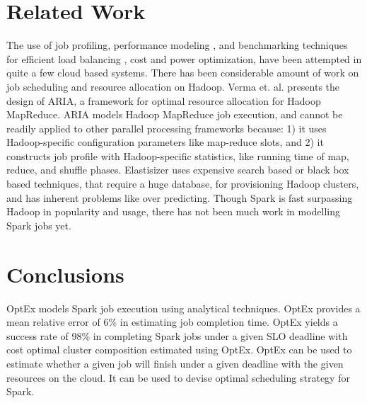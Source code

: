 \documentclass[conference]{IEEEtran}
\begin{document}
\section{Related Work}\label{sec:related}
The use of job profiling, performance modeling \cite{brebner2011}, and benchmarking techniques \cite{Dejun:2011:RPW:2002168.2002173} for efficient load
balancing \cite{daniel2011prediction, Imai:2013:ARP:2588611.2588688}, cost \cite{singer2010towards} and power optimization, have been attempted in quite a few cloud based systems.
There has been considerable amount of work
\cite{Herodotou:2011:NOS:2038916.2038934,Verma:2011:AAR:1998582.1998637, alrokayan2014sla}
 on job scheduling and resource allocation on Hadoop. Verma et. al. \cite{Verma:2011:AAR:1998582.1998637} presents the design of ARIA, a
framework for optimal resource allocation for Hadoop MapReduce.
ARIA \cite{Verma:2011:AAR:1998582.1998637} models Hadoop MapReduce job execution, and cannot be readily applied to other parallel processing frameworks because: 1) it uses Hadoop-specific configuration parameters like map-reduce slots,
 and 2) it
constructs job profile with Hadoop-specific statistics, like running time of map, reduce, and shuffle phases.
 Elastisizer \cite{Herodotou:2011:NOS:2038916.2038934} uses expensive search based or black box based techniques, that require a huge database, for provisioning Hadoop clusters, and has inherent problems like over predicting. Though Spark \cite{Zaharia:2012:RDD:2228298.2228301} is fast surpassing Hadoop in popularity and usage, there has not been much work in modelling Spark jobs yet.  
\section{Conclusions}\label{sec:conclusion}
OptEx models Spark job execution using analytical techniques. OptEx provides a mean relative error of 6\% in estimating job completion time.
    OptEx yields a success rate of 98\% in completing Spark jobs under a given SLO deadline
    with cost optimal cluster composition estimated using OptEx. OptEx can be used to estimate whether a given job will finish under a given deadline with the given resources on the cloud. It can be used to devise optimal scheduling strategy for Spark. 

\renewcommand{\bibfont}{\footnotesize}


\end{document}
